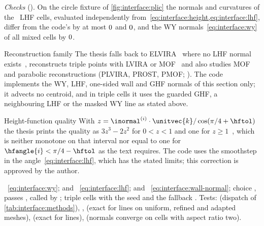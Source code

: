\emph{Checks} (). On the circle fixture of
\cref{fig:interface:plic} the normals and curvatures of the \chkLhfCells\ LHF
cells, evaluated independently from~\cref{eq:interface:height,eq:interface:lhf},
differ from the code's by at most $0$ and $0$, and
the WY normals~\cref{eq:interface:wy} of all mixed cells by $0$.

\begin{deviation}{Reconstruction family}
The thesis falls back to ELVIRA~\cite{pilliod2004} where no LHF normal
exists~, reconstructs triple points with LVIRA or
MOF~ and also studies MOF and parabolic reconstructions
(PLVIRA, PROST, PMOF; ). The code implements the WY,
LHF, one-sided wall and GHF normals of this section only; it advects no
centroid, and in triple cells it uses the guarded GHF, a neighbouring LHF or
the masked WY line as stated above.
\end{deviation}

\begin{deviation}{Height-function quality}
With $z=\inormal^{(i)}\cdot\unitvec{k}/\cos(\pi/4+\hftol)$ the thesis prints
the quality as $3z^3-2z^2$ for $0<z<1$ and one for $z\ge1$~, which is neither monotone on that interval nor equal
to one for $\hfangle{i}<\pi/4-\hftol$ as the text requires. The code uses the
smoothstep in the angle~\cref{eq:interface:lhf}, which has the stated limits;
this correction is approved by the author.
\end{deviation}

\begin{implnote}
~\cref{eq:interface:wy};
 and
~\cref{eq:interface:lhf};
 and
~\cref{eq:interface:wall-normal};
choice ,
passes ,
called by ; triple cells
with the seed 
and the fallback .
Tests:
(dispatch of \cref{tab:interface:methods}),
,
(exact for lines on uniform, refined and adapted meshes),
(exact for lines),
(normals converge on cells with aspect ratio two).
\end{implnote}

